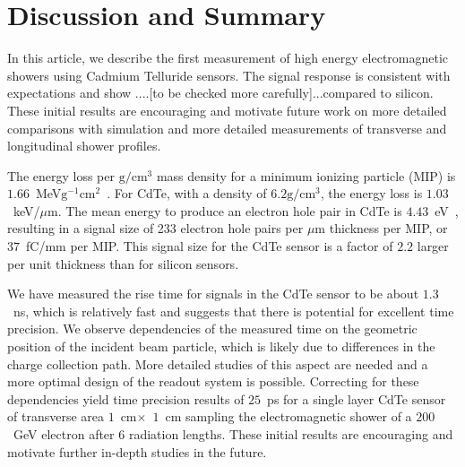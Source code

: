 
\section{Discussion and Summary}
\label{sec:summary} 


In this article, we describe the first measurement of high energy 
electromagnetic showers using Cadmium Telluride sensors. The signal response
is consistent with expectations and show ....[to be checked more carefully]...compared to silicon.
These initial results are encouraging and motivate future work on 
more detailed comparisons with simulation and more detailed 
measurements of transverse and longitudinal shower profiles.


The energy loss per $\mathrm{g}/\mathrm{cm}^{3}$ mass density 
for a minimum ionizing particle (MIP) is $1.66$~MeV$\mathrm{g}^{-1}\mathrm{cm}^{2}$~\cite{PDG}. 
For CdTe, with a density of $6.2\mathrm{g}/\mathrm{cm}^{3}$, the energy
loss is $1.03$~keV/$\mu$m. The mean energy to produce an electron hole pair
in CdTe is $4.43$~eV~\cite{Sze,Singh}, resulting in a signal size of
233 electron hole pairs per $\mu$m thickness per MIP, or $37$~fC/mm per
MIP. This signal size for the CdTe sensor is a factor of $2.2$ larger per unit thickness
than for silicon sensors. 




We have measured the rise time for signals in the CdTe sensor to be about $1.3$~ns, which
is relatively fast and suggests that there is potential for excellent time precision.
We observe dependencies of the measured time on the geometric position of the
incident beam particle, which is likely due to differences in the charge collection
path. More detailed studies of this aspect are needed and a more optimal design of the 
readout system is possible. Correcting for these dependencies yield time precision results
of $25$~ps for a single layer CdTe sensor of transverse area $1$~cm$\times$~$1$~cm
sampling the electromagnetic shower of a $200$~GeV electron after $6$ radiation lengths. 
These initial results are encouraging and motivate further in-depth studies in the
future.




